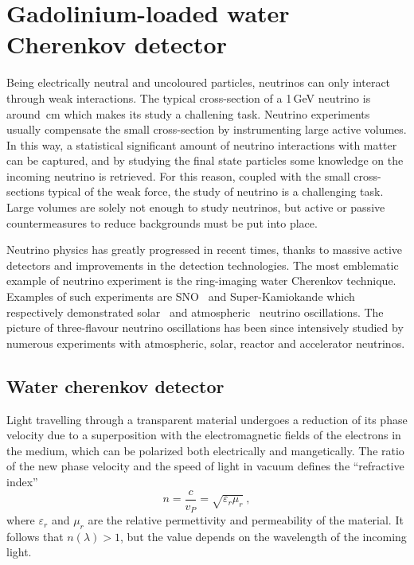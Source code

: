 \chapter{Gadolinium-loaded water Cherenkov detector}

Being electrically neutral and uncoloured particles, neutrinos can only interact through weak interactions.
The typical cross-section of a 1\,GeV neutrino is around \,cm %
which makes its study a challening task.
Neutrino experiments usually compensate the small cross-section by instrumenting large active volumes.
In this way, a statistical significant amount of neutrino interactions with matter can be captured, %
and by studying the final state particles some knowledge on the incoming neutrino is retrieved.
For this reason, coupled with the small cross-sections typical of the weak force, %
the study of neutrino is a challenging task.
Large volumes are solely not enough to study neutrinos, but active or passive countermeasures
to reduce backgrounds must be put into place.

Neutrino physics has greatly progressed in recent times, thanks to massive active detectors and %
improvements in the detection technologies.
The most emblematic example of neutrino experiment is the ring-imaging water Cherenkov technique.
Examples of such experiments are SNO~\cite{} and Super-Kamiokande
which respectively demonstrated solar~\cite{Aharmim:2005gt} and atmospheric~\cite{Fukuda:1998mi} neutrino oscillations.
The picture of three-flavour neutrino oscillations has been since intensively studied %
by numerous experiments with atmospheric, solar, reactor and accelerator neutrinos.

\section{Water cherenkov detector}
\label{sec:wch}


Light travelling through a transparent material undergoes a reduction of its phase velocity %
due to a superposition with the electromagnetic fields of the electrons in the medium, which can be %
polarized both electrically and mangetically.
The ratio of the new phase velocity and the speed of light in vacuum defines the ``refractive index''
\begin{equation}
	\label{eq:ref_index}
	n = \frac{c}{v_P} = \sqrt{\varepsilon_r \mu_r}\ ,
\end{equation}
where $\varepsilon_r$ and $\mu_r$ are the relative permettivity and permeability of the material.
It follows that $n(\lambda) > 1$, but the value depends on the wavelength of the incoming light.

